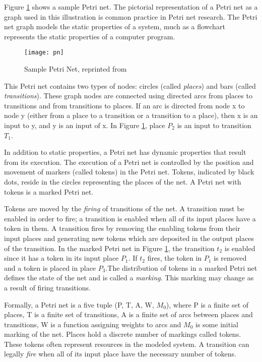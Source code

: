 Figure \ref{fig:pn} shows a sample Petri net. The pictorial representation of a Petri net as a graph used in this illustration is common practice in Petri net research. The Petri net graph models the static properties of a system, much as a flowchart represents the static properties of a computer program. 

\begin{figure}[h]
	\centering
	\texttt{[image: pn]}
	\caption{Sample Petri Net, reprinted from \cite{peterson1977petri}}
	\label{fig:pn}
\end{figure}

This Petri net contains two types of nodes: circles (called \emph{places}) and bars (called \emph{transitions}). These graph nodes are connected using directed arcs from places to transitions and from transitions to places. If an arc is directed from node x to node y (either from a place to a transition or a transition to a place), then x is an input to y, and y is an input of x. In Figure \ref{fig:pn}, place $P_2$ is an input to transition $T_1$. 

In addition to static properties, a Petri net has dynamic properties that result from its execution. The execution of a Petri net is controlled by the position and movement of markers (called tokens) in the Petri net. Tokens, indicated by black dots, reside in the circles representing the places of the net. A Petri net with tokens is a marked Petri net. 

Tokens are moved by the \emph{firing} of transitions of the net. A transition must be enabled in order to fire; a transition is enabled when all of its input places have a token in them. A transition fires by removing the enabling tokens from their input places and generating new tokens which are deposited in the output places of the transition. In the marked Petri net in Figure \ref{fig:pn}, the transition $t_2$ is enabled since it has a token in its input place $P_1$. If $t_2$ fires, the token in $P_1$ is removed and a token is placed in place $P_3$.The distribution of tokens in a marked Petri net defines the state of the net and is called a \emph{marking}. This marking may change as a result of firing transitions. 

Formally, a Petri net is a five tuple (P, T, A, W, $M_0$), where P is a finite set of places, T is a finite set of transitions, A is a finite set of arcs between places and transitions, W is a function assigning weights to arcs and $M_0$ is some initial marking of the net. Places hold a discrete number of markings called tokens. These tokens often represent resources in the modeled system. A transition can legally \emph{fire} when all of its input place have the necessary number of tokens. 

